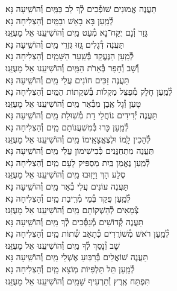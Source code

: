 \documentclass[twoside, openany, parskip=half, 11pt]{book}
\begin{document}
\begin{small}
תַּעֲנֶה אֱמוּנִים שׁוֹפְ֯כִים לְ֯ךָ לֵב כַּמַּֽיִם \hfill וְ֯הוֹשִֽׁיעָה נָּא׃\\
לְ֯מַֽעַן בָּא בָאֵשׁ וּבַמַּֽיִם \hfill וְ֯הַצְלִיחָה נָא׃ \\
גָּזַר וְ֯נָם יֻקַּח־נָא מְ֯עַט מַֽיִם \hfill וְ֯הוֹשִׁיעֵֽנוּ אֵל מָעֻזֵּֽנוּ׃\\
תַּעֲנֶה דְ֯גָלִים גָּֽזוּ גִּזְרֵי מַֽיִם \hfill וְ֯הוֹשִֽׁיעָה נָּא׃\\
לְ֯מַֽעַן הַנֶּעֱקַד בְּ֯שַֽׁעַר הַשָּׁמַֽיִם \hfill וְ֯הַצְלִיחָה נָא׃\\
וְ֯שָׁב וְ֯חָפַר בְּ֯אֵרֹת הַמַּֽיִם \hfill וְ֯הוֹשִׁיעֵֽנוּ אֵל מָעֻזֵּֽנוּ׃\\
תַּעֲנֶה זַכִּים חוֹנִים עֲלֵי מַֽיִם \hfill וְ֯הוֹשִֽׁיעָה נָּא׃\\
לְ֯מַֽעַן חָלָק מְ֯פַצֵּל מַקְלוֹת בְּ֯שִׁקֲתוֹת הַמַּֽיִם \hfill וְ֯הַצְלִיחָה נָא׃\\
טָעַן וְ֯גָל אֶֽבֶן מִבְּ֯אֵר מַֽיִם \hfill וְ֯הוֹשִׁיעֵֽנוּ אֵל מָעֻזֵּֽנוּ׃\\
תַּעֲנֶה יְ֯דִידִים נוֹחֲלֵי דָת מְ֯שֽׁוּלַת מַֽיִם \hfill וְ֯הוֹשִֽׁיעָה נָּא׃ \\
לְ֯מַֽעַן כָּרוּ בְּ֯מִשְׁעֲנוֹתָם מַֽיִם \hfill וְ֯הַצְלִיחָה נָא׃\\
לְ֯הָכִין לָֽמוֹ וּלְצֶאֱצָאֵֽימוֹ מַֽיִם \hfill וְ֯הוֹשִׁיעֵֽנוּ אֵל מָעֻזֵּֽנוּ׃\\
תַּעֲנֶה מִתְחַנֲּנִים כְּ֯בִישִׁימוֹן עֲלֵי מַֽיִם \hfill וְ֯הוֹשִֽׁיעָה נָּא׃\\
לְ֯מַֽעַן נֶאֱמַן בַּֽיִת מַסְפִּיק לָעָם מַֽיִם \hfill וְ֯הַצְלִיחָה נָא׃\\
סֶלַע הָךְ וַיָזֽוּבוּ מַֽיִם \hfill וְ֯הוֹשִׁיעֵֽנוּ אֵל מָעֻזֵּֽנוּ׃ \\
תַּעֲנֶה עוֹנִים עֲלִי בְ֯אֵר מַֽיִם \hfill וְ֯הוֹשִֽׁיעָה נָּא׃ \\
לְ֯מַֽעַן פֻּקַּד בְּ֯מֵי מְ֯רִֽיבַת מַֽיִם \hfill וְ֯הַצְלִיחָה נָא׃\\
צְ֯מֵאִים לְ֯הַשְׁקוֹתָם מַֽיִם \hfill וְ֯הוֹשִׁיעֵֽנוּ אֵל מָעֻזֵּנוּ׃ \\
תַּעֲנֶה קְ֯דוֹשִׁים מְ֯נַסְּ֯כִים לְ֯ךָ מַֽיִם \hfill וְ֯הוֹשִֽׁיעָה נָּא׃ \\
לְ֯מַֽעַן רֹאשׁ מְ֯שׁוֹרֲרִים כְּ֯תָאַב שְׁ֯תוֹת מַֽיִם \hfill וְ֯הַצְלִיחָה נָא׃\\
שָׁב וְ֯נָסַךְ לְ֯ךָ מַֽיִם \hfill וְ֯הוֹשִׁיעֵֽנוּ אֵל מָעֻזֵּֽנוּ׃\\
תַּעֲנֶה שׁוֹאֲלִים בְּ֯רִבּֽוּעַ אֶשְׁלֵי מַֽיִם \hfill וְ֯הוֹשִֽׁיעָה נָּא׃ \\
לְ֯מַֽעַן תֵּל תַּלְפִּיוֹת מֽוֹצָא מַֽיִם \hfill וְ֯הַצְלִיחָה נָא׃\\
תִּפְתַּח אֶֽרֶץ וְ֯תַרְעִיף שָׁמַֽיִם \hfill וְ֯הוֹשִׁיעֵֽנוּ אֵל מָעֻזֵּֽנוּ׃

\end{small}
\end{document}
